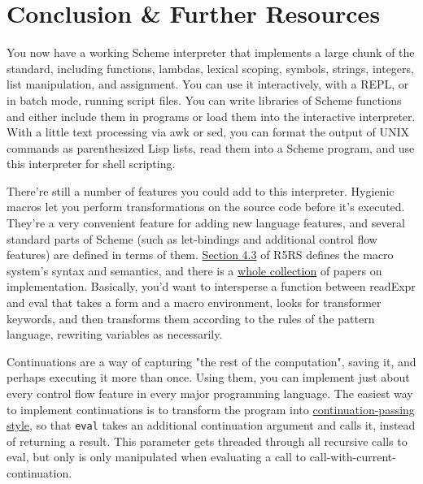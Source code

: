 \chapter*{Conclusion \& Further Resources}
 
 
You now have a working Scheme interpreter that implements a large chunk of the standard, including functions, lambdas, lexical scoping, symbols, strings, integers, list manipulation, and assignment. You can use it interactively, with a REPL, or in batch mode, running script files. You can write libraries of Scheme functions and either include them in programs or load them into the interactive interpreter. With a little text processing via awk or sed, you can format the output of UNIX commands as parenthesized Lisp lists, read them into a Scheme program, and use this interpreter for shell scripting.
 
There're still a number of features you could add to this interpreter. Hygienic macros let you perform transformations on the source code before it's executed. They're a very convenient feature for adding new language features, and several standard parts of Scheme (such as let-bindings and additional control flow features) are defined in terms of them. \href{http://www.schemers.org/Documents/Standards/R5RS/HTML/r5rs-Z-H-7.html\#\%_sec_4.3}{Section 4.3} of R5RS defines the macro system's syntax and semantics, and there is a \href{http://library.readscheme.org/page3.html}{whole collection} of papers on implementation. Basically, you'd want to intersperse a function between readExpr and eval that takes a form and a macro environment, looks for transformer keywords, and then transforms them according to the rules of the pattern language, rewriting variables as necessarily.
 
Continuations are a way of capturing "the rest of the computation", saving it, and perhaps executing it more than once. Using them, you can implement just about every control flow feature in every major programming language. The easiest way to implement continuations is to transform the program into \href{http://library.readscheme.org/page6.html}{continuation-passing style}, so that \verb|eval| takes an additional continuation argument and calls it, instead of returning a result. This parameter gets threaded through all recursive calls to eval, but only is only manipulated when evaluating a call to call-with-current-continuation.
 
